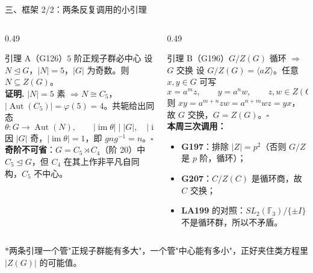 \documentclass[aspectratio=169,10pt,fontset=none]{ctexbeamer}
\newcommand{\ex}[1]{\textcolor{accent}{\footnotesize\bfseries #1}}
\newcommand{\key}[1]{\textcolor{ink}{\bfseries #1}}
\newcommand{\starpt}{\textcolor{accent}{\bfseries$\ast$}}
\begin{document}
\begin{frame}[t]{三、框架 2/2：两条反复调用的小引理}
  \begin{columns}[T,onlytextwidth]
    \begin{column}{0.49\textwidth}
      \begin{alertblock}{\footnotesize 引理 A（G126）$5$ 阶正规子群必中心}
        \scriptsize
        设 $N\trianglelefteq G$，$|N|=5$，$|G|$ 为奇数。则 $N\subseteq Z(G)$。\\[2pt]
        \textbf{证明.} $|N|=5$ 素 $\Rightarrow N\cong C_5$，$|\operatorname{Aut}(C_5)|=\varphi(5)=4$。共轭给出同态
        \[ \theta:G\to\operatorname{Aut}(N),\qquad |\operatorname{im}\theta|\mid|G|,\quad |\operatorname{im}\theta|\mid4. \]
        因 $|G|$ 奇，$|\operatorname{im}\theta|=1$，即 $gng^{-1}=n$。$\square$\\[2pt]
        \key{奇阶不可省}：$G=C_5\rtimes C_4$（阶 20）中 $C_5\trianglelefteq G$，但 $C_4$ 在其上作非平凡自同构，$C_5$ 不中心。
      \end{alertblock}
    \end{column}
    \begin{column}{0.49\textwidth}
      \begin{alertblock}{\footnotesize 引理 B（G196）$G/Z(G)$ 循环 $\Rightarrow$ $G$ 交换}
        \scriptsize
        设 $G/Z(G)=\langle aZ\rangle$。任意 $x,y\in G$ 可写
        \[ x=a^m z,\qquad y=a^n w,\qquad z,w\in Z(G). \]
        则 $xy=a^{m+n}zw=a^{n+m}wz=yx$，故 $G$ 交换，$G=Z(G)$。$\square$\\[3pt]
        \key{本周三次调用：}
        \begin{itemize}\setlength{\itemsep}{0pt}
          \item \ex{G197}：排除 $|Z|=p^2$（否则 $G/Z$ 是 $p$ 阶，循环）；
          \item \ex{G207}：$C/Z(C)$ 是循环商，故 $C$ 交换；
          \item \ex{LA199} 的对照：$SL_2(\mathbb F_3)/\{\pm I\}$ 不是循环群，所以不矛盾。
        \end{itemize}
      \end{alertblock}
    \end{column}
  \end{columns}
  \footnotesize\color{ink!80}
  \starpt 两条引理一个管"正规子群能有多大"，一个管"中心能有多小"，正好夹住类方程里 $|Z(G)|$ 的可能值。
\end{frame}
\end{document}
